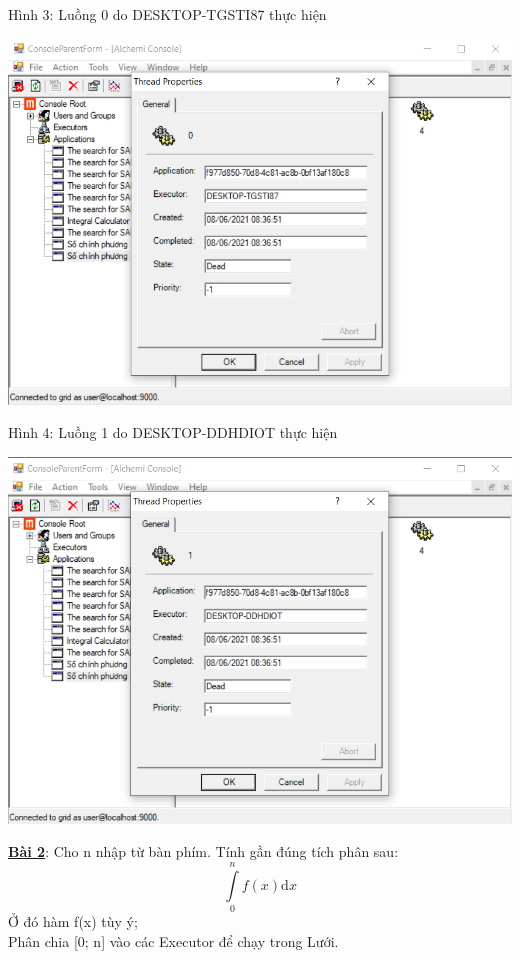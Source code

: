 \documentclass[12pt,a4paper]{article}
\begin{document}
Hình 3: Luồng 0 do DESKTOP-TGSTI87 thực hiện
\begin{center}
\includegraphics[scale=0.86]{2.1.png} \\[0.5cm]
\end{center}



Hình 4: Luồng 1 do DESKTOP-DDHDIOT thực hiện
\begin{center}
\includegraphics[scale=0.88]{2.2.png}
\end{center}

\newpage	

\underline{\textbf{Bài 2}}: Cho n nhập từ bàn phím. Tính gần đúng tích phân sau:
\begin{equation}
\displaystyle\int\limits_{0}^{n} f(x) \mathrm{d}x
\end{equation}
Ở đó hàm f(x) tùy ý;\\
Phân chia [0; n] vào các Executor để chạy trong Lưới. \\[1cm]
\end{document}
